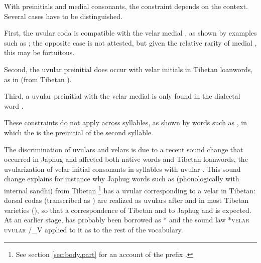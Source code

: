 With preinitials and medial consonants, the constraint depends on the context. Several cases have to be distinguished.

First, the uvular coda  is compatible with the velar medial , as shown by examples such as ; the opposite case is not attested, but given the relative rarity of medial , this may be fortuitous.

Second, the uvular preinitial   does occur with velar initials in Tibetan loanwords, as in  (from Tibetan ).

Third, a uvular preinitial with the velar medial  is only found in the dialectal word .

These constraints do not apply across syllables, as shown by words such as , in which the  is the preinitial of the second syllable.

The discrimination of uvulars and velars is due to a recent sound change that occurred in Japhug and affected both native words and Tibetan loanwords, the uvularization of velar initial consonants in syllables with uvular . This sound change explains for instance why Japhug words such as  (phonologically  with internal sandhi) from Tibetan \footnote{See section \ref{sec:body.part} for an account of the prefix .} has a uvular  corresponding to a velar  in Tibetan: dorsal codas (transcribed as ) are realized as uvulars after  and  in most Tibetan varieties (\citealt{gong16amdo}), so that a correspondence of Tibetan  and  to Japhug  and  is expected. At an earlier stage,  has probably been borrowed as * and the sound law *\textsc{velar} \fl{} \textsc{uvular} /\_V applied to it as to the rest of the vocabulary.
